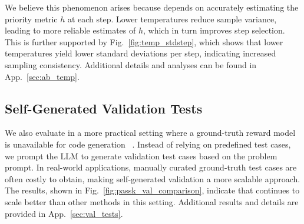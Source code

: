 We believe this phenomenon arises because \decomp depends on accurately estimating the priority metric $h$ at each step. Lower temperatures reduce sample variance, leading to more reliable estimates of $h$, which in turn improves step selection. 
This is further supported by Fig.~\ref{fig:temp_stdstep}, which shows that lower temperatures yield lower standard deviations per step, indicating increased sampling consistency.
Additional details and analyses can be found in App.~\ref{sec:ab_temp}.




\subsection{Self-Generated Validation Tests}

We also evaluate \decomp in a more practical setting where a ground-truth reward model is unavailable for code generation ~\citep{chen2022codet, chen2023teaching, zhou2023language}. Instead of relying on predefined test cases, we prompt the LLM to generate validation test cases based on the problem prompt. In real-world applications, manually curated ground-truth test cases are often costly to obtain, making self-generated validation a more scalable approach. The results, shown in Fig.~\ref{fig:passk_val_comparison}, indicate that \decomp continues to scale better than other methods in this setting. Additional results and details are provided in App.~\ref{sec:val_tests}. 

